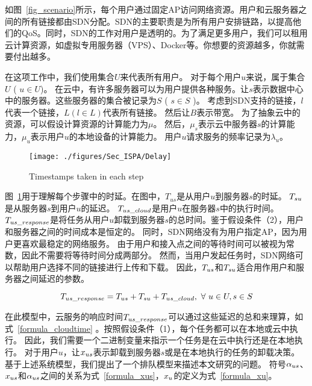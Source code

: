 如图~\ref{fig_scenario}所示，每个用户通过固定AP访问网络资源。用户和云服务器之间的所有链接都由SDN分配。SDN的主要职责是为所有用户安排链路，以提高他们的QoS。同时，SDN的工作对用户是透明的。为了满足更多用户，我们可以租用云计算资源，如虚拟专用服务器（VPS）、Docker等。你想要的资源越多，你就需要付出越多。

在这项工作中，我们使用集合$U$来代表所有用户。 对于每个用户$u$来说，属于集合$U$ ( $ u \in U $)。 在云中，有许多服务器可以为用户提供各种服务。让$s$表示数据中心中的服务器。这些服务器的集合被记录为$S$ ( $ s \in S $ )。 考虑到SDN支持的链接，$l$代表一个链接，$ L ( l \in L ) $代表所有链接。 然后让$B$表示带宽。 为了抽象云中的资源，可以假设计算资源的计算能力为$\mu$。 然后，$\mu_s$表示云中服务器$s$的计算能力，$\mu_u$表示用户$u$的本地设备的计算能力。 用户$u$请求服务的频率记录为$ \lambda_u $。

\begin{figure}[!h]
  \centering
  \vspace{-1em}
  \texttt{[image: ./figures/Sec\_ISPA/Delay]}
  \vspace{-1em}
  \caption{Timestamps taken in each step}
  \vspace{-1em}
  \label{fig_timestaps}
\end{figure}

图~\ref{fig_timestaps}用于理解每个步骤中的时延。在图中，${T}_{us}$是从用户$u$到服务器$s$的时延。 ${T}_{su}$是从服务器$s$到用户$u$的延迟。 ${T}_{us\_cloud}$是用户$u$在服务器$s$中的执行时间。 ${T}_{us\_response}$是将任务从用户$u$卸载到服务器$s$的总时间。鉴于假设条件（2），用户和服务器之间的时间成本是恒定的。 同时，SDN网络没有为用户指定AP，因为用户更喜欢最稳定的网络服务。 由于用户和接入点之间的等待时间可以被视为常数，因此不需要将等待时间分成两部分。 然而，当用户发起任务时，SDN网络可以帮助用户选择不同的链接进行上传和下载。 因此，${T}_{us}$和${T}_{su}$适合用作用户和服务器之间延迟的参数。

\vspace{-1.5em}
\begin{equation}
\label{formula_cloudtime}
{T}_{us\_response} = {T}_{us} + {T}_{su} + {T}_{us\_cloud},\ \forall \ u \in U, s \in S
\end{equation}

在此模型中，云服务的响应时间${T}_{us\_response}$可以通过这些延迟的总和来理算，如式~\eqref{formula_cloudtime} 。按照假设条件（1），每个任务都可以在本地或云中执行。 因此，我们需要一个二进制变量来指示一个任务是在云中执行还是在本地执行。 对于用户$u$，让${x}_{us}$表示卸载到服务器$s$或是在本地执行的任务的卸载决策。 基于上述系统模型，我们提出了一个排队模型来描述本文研究的问题。 符号${\alpha}_{us}$、${x}_{us}$和${\alpha}_{us}$之间的关系为式~\eqref{formula_xus}，${x}_{u}$的定义为式~\eqref{formula_xu}。

